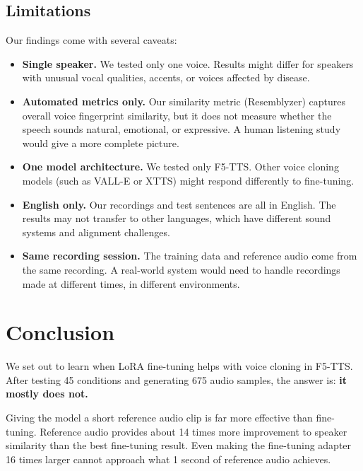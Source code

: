 \documentclass[11pt, a4paper]{article}
\begin{document}
\subsection{Limitations}

Our findings come with several caveats:

\begin{itemize}[itemsep=4pt]
    \item \textbf{Single speaker.} We tested only one voice. Results might differ for speakers with unusual vocal qualities, accents, or voices affected by disease.

    \item \textbf{Automated metrics only.} Our similarity metric (Resemblyzer) captures overall voice fingerprint similarity, but it does not measure whether the speech sounds natural, emotional, or expressive. A human listening study would give a more complete picture.

    \item \textbf{One model architecture.} We tested only F5-TTS. Other voice cloning models (such as VALL-E or XTTS) might respond differently to fine-tuning.

    \item \textbf{English only.} Our recordings and test sentences are all in English. The results may not transfer to other languages, which have different sound systems and alignment challenges.

    \item \textbf{Same recording session.} The training data and reference audio come from the same recording. A real-world system would need to handle recordings made at different times, in different environments.
\end{itemize}

\section{Conclusion}

We set out to learn when LoRA fine-tuning helps with voice cloning in F5-TTS. After testing 45 conditions and generating 675 audio samples, the answer is: \textbf{it mostly does not.}

Giving the model a short reference audio clip is far more effective than fine-tuning. Reference audio provides about 14 times more improvement to speaker similarity than the best fine-tuning result. Even making the fine-tuning adapter 16 times larger cannot approach what 1 second of reference audio achieves.
\end{document}
